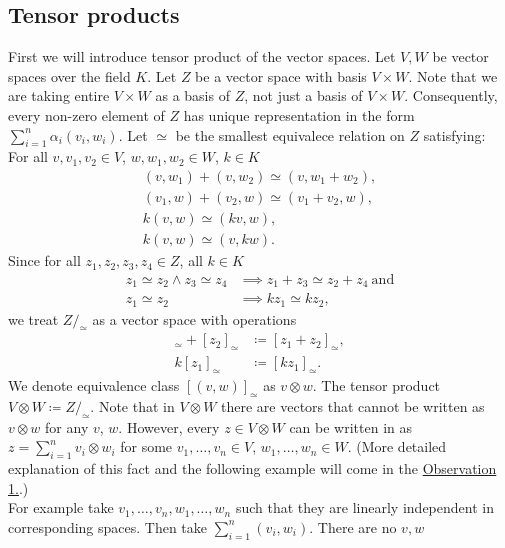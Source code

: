 \documentclass[a4paper, 12pt]{report}
\begin{document}
\subsection{Tensor products}
%
First we will introduce tensor product of the vector spaces. Let $V, W$ be vector spaces over the field $K$.
Let $Z$ be a vector space with basis $V \times W$. Note that we are taking entire $V \times W$ as a basis
of $Z$, not just a basis of $V \times W$. Consequently, every non-zero element of $Z$ has unique
representation in the form
$\displaystyle\sum^n_{i = 1}\alpha_i(v_i,w_i)$.
Let $\simeq$ be the smallest equivalece relation on $Z$ satisfying: \\
%
For all $v,v_1,v_2 \in V$, $w, w_1, w_2 \in W$, $k \in K$
\begin{gather*}
(v,w_1) + (v, w_2) \simeq (v, w_1 + w_2), \\
(v_1,w) +(v_2, w) \simeq (v_1+v_2,w), \\
k(v, w) \simeq (kv, w), \\
k(v, w) \simeq (v, kw).
\end{gather*}
Since for all $z_1, z_2, z_3, z_4 \in Z$, all $k \in K$
\begin{align*}
z_1 \simeq z_2 \land z_3 \simeq z_4 &\implies z_1 + z_3 \simeq z_2 + z_4 \mathrm{\ and} \\
z_1 \simeq z_2 &\implies kz_1 \simeq kz_2,
\end{align*}
%
we treat $Z/_\simeq$ as a vector space with operations
%
\begin{align*}
[z_1]_\simeq + [z_2]_\simeq &\coloneqq [z_1 + z_2]_\simeq, \\
k[z_1]_\simeq &\coloneqq [kz_1]_\simeq.
\end{align*}
%
We denote equivalence class $[(v,w)]_\simeq$ as $v \otimes w$.
The tensor product $V \otimes W \coloneqq Z/_\simeq$.
Note that in $V \otimes W$ there are vectors that cannot be written as $v \otimes w$ for any $v$, $w$.
However, every $z \in V \otimes W$ can be written in as $z =\displaystyle\sum^n_{i = 1}v_i \otimes w_i$
for some $v_1, \dots, v_n \in V$, $w_1, \dots, w_n \in W$.
(More detailed explanation of this fact and the following example will come in the
\hyperref[observation:1]{Observation 1.}.)\\
For example take $v_1,\dots, v_n, w_1, \dots, w_n$ such that they are linearly independent
in corresponding spaces.
Then take $\displaystyle\sum^n_{i=1}(v_i,w_i)$. There are no $v, w$
\end{document}
